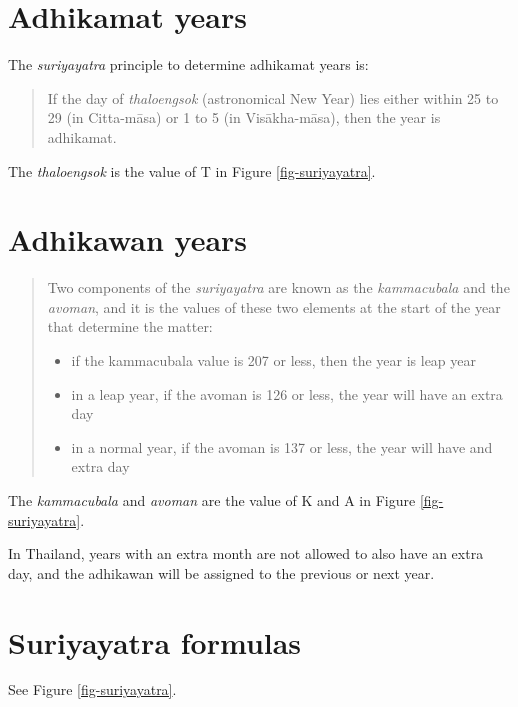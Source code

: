 \documentclass[11pt,oneside]{memoir-article}
\begin{document}
\section{Adhikamat years}
\label{sec-3-3}
\label{adhikamat-years}

The \emph{suriyayatra} principle to determine adhikamat years is:

\begin{quote}
If the day of \emph{thaloengsok} (astronomical New Year)
lies either within 25 to 29 (in Citta-māsa) or 1 to 5 (in
Visākha-māsa), then the year is adhikamat.\cite{prasert-ngan}
\end{quote}

The \emph{thaloengsok} is the value of T in Figure \ref{fig-suriyayatra}.

\section{Adhikawan years}
\label{sec-3-4}
\label{adhikawan-years}

\begin{quote}
Two components of the \emph{suriyayatra} are known as the \emph{kammacubala} and
the \emph{avoman}, and it is the values of these two elements at the start
of the year that determine the matter:

\begin{itemize}
\item if the kammacubala value is 207 or less, then the year is leap year
\item in a leap year, if the avoman is 126 or less, the year will have an
extra day
\item in a normal year, if the avoman is 137 or less, the year will have
and extra day\cite{eade-interpolation}
\end{itemize}
\end{quote}

The \emph{kammacubala} and \emph{avoman} are the value of K and A in Figure
\ref{fig-suriyayatra}.

In Thailand, years with an extra month are not allowed to also have an
extra day, and the adhikawan will be assigned to the previous or next
year.

\section{Suriyayatra formulas}
\label{sec-3-5}

See Figure \ref{fig-suriyayatra}.
\end{document}
